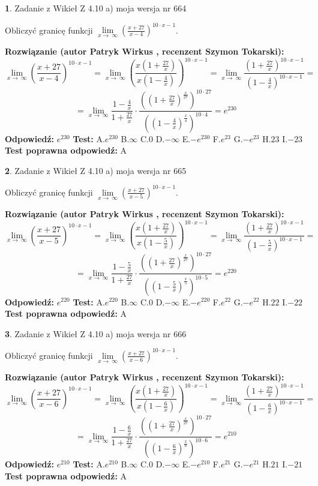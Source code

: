 \documentclass[12pt, a4paper]{article}
\theoremstyle{definition} %
\newtheorem{zad}{}
\newcommand{\zadStart}[1]{\begin{zad}#1\newline}
\newcommand{\zadStop}{\end{zad}}
\newcommand{\rozwStart}[2]{\noindent \textbf{Rozwiązanie (autor #1 , recenzent #2): }\newline}
\newcommand{\rozwStop}{\newline}
\newcommand{\odpStart}{\noindent \textbf{Odpowiedź:}\newline}
\newcommand{\odpStop}{\newline}
\newcommand{\testStart}{\noindent \textbf{Test:}\newline}
\newcommand{\testStop}{\newline}
\newcommand{\kluczStart}{\noindent \textbf{Test poprawna odpowiedź:}\newline}
\newcommand{\kluczStop}{\newline}
\begin{document}
\zadStart{Zadanie z Wikieł Z 4.10 a) moja wersja nr 664}

Obliczyć granicę funkcji  $\lim\limits_{x\to\ \infty}(\frac{x+27}{x-4})^{10\cdot x-1}$.
\zadStop
\rozwStart{Patryk Wirkus}{Szymon Tokarski}
$$\lim\limits_{x\to\ \infty}(\frac{x+27}{x-4})^{10\cdot x-1} = \lim\limits_{x\to\ \infty}(\frac{x(1+\frac{27}{x})}{x(1-\frac{4}{x})})^{10\cdot x-1}=\lim\limits_{x\to\ \infty}\frac{(1+\frac{27}{x})^{10\cdot x-1}}{(1-\frac{4}{x})^{10\cdot x-1}}=$$
$$=\lim\limits_{x\to\ \infty}\frac{1-\frac{4}{x}}{1+\frac{27}{x}}\cdot\frac{((1+\frac{27}{x})^{\frac{x}{27}})^{10\cdot27}}{((1-\frac{4}{x})^{\frac{x}{4}})^{10\cdot4}}=e^{230}$$
\rozwStop
\odpStart
$e^{230}$
\odpStop
\testStart
A.$e^{230}$ B.$\infty$ C.$0$ D.$-\infty$ E.$-e^{230}$
F.$e^{23}$ G.$-e^{23}$
H.$23$
I.$-23$
\testStop
\kluczStart
A
\kluczStop



\zadStart{Zadanie z Wikieł Z 4.10 a) moja wersja nr 665}

Obliczyć granicę funkcji  $\lim\limits_{x\to\ \infty}(\frac{x+27}{x-5})^{10\cdot x-1}$.
\zadStop
\rozwStart{Patryk Wirkus}{Szymon Tokarski}
$$\lim\limits_{x\to\ \infty}(\frac{x+27}{x-5})^{10\cdot x-1} = \lim\limits_{x\to\ \infty}(\frac{x(1+\frac{27}{x})}{x(1-\frac{5}{x})})^{10\cdot x-1}=\lim\limits_{x\to\ \infty}\frac{(1+\frac{27}{x})^{10\cdot x-1}}{(1-\frac{5}{x})^{10\cdot x-1}}=$$
$$=\lim\limits_{x\to\ \infty}\frac{1-\frac{5}{x}}{1+\frac{27}{x}}\cdot\frac{((1+\frac{27}{x})^{\frac{x}{27}})^{10\cdot27}}{((1-\frac{5}{x})^{\frac{x}{5}})^{10\cdot5}}=e^{220}$$
\rozwStop
\odpStart
$e^{220}$
\odpStop
\testStart
A.$e^{220}$ B.$\infty$ C.$0$ D.$-\infty$ E.$-e^{220}$
F.$e^{22}$ G.$-e^{22}$
H.$22$
I.$-22$
\testStop
\kluczStart
A
\kluczStop



\zadStart{Zadanie z Wikieł Z 4.10 a) moja wersja nr 666}

Obliczyć granicę funkcji  $\lim\limits_{x\to\ \infty}(\frac{x+27}{x-6})^{10\cdot x-1}$.
\zadStop
\rozwStart{Patryk Wirkus}{Szymon Tokarski}
$$\lim\limits_{x\to\ \infty}(\frac{x+27}{x-6})^{10\cdot x-1} = \lim\limits_{x\to\ \infty}(\frac{x(1+\frac{27}{x})}{x(1-\frac{6}{x})})^{10\cdot x-1}=\lim\limits_{x\to\ \infty}\frac{(1+\frac{27}{x})^{10\cdot x-1}}{(1-\frac{6}{x})^{10\cdot x-1}}=$$
$$=\lim\limits_{x\to\ \infty}\frac{1-\frac{6}{x}}{1+\frac{27}{x}}\cdot\frac{((1+\frac{27}{x})^{\frac{x}{27}})^{10\cdot27}}{((1-\frac{6}{x})^{\frac{x}{6}})^{10\cdot6}}=e^{210}$$
\rozwStop
\odpStart
$e^{210}$
\odpStop
\testStart
A.$e^{210}$ B.$\infty$ C.$0$ D.$-\infty$ E.$-e^{210}$
F.$e^{21}$ G.$-e^{21}$
H.$21$
I.$-21$
\testStop
\kluczStart
A
\kluczStop
\end{document}
